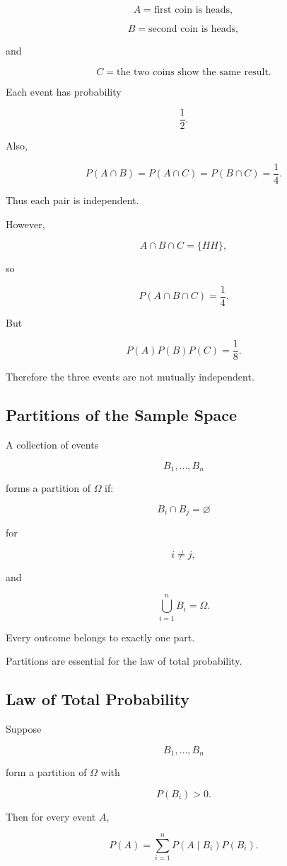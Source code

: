 \[
A
=
\text{first coin is heads},
\]

\[
B
=
\text{second coin is heads},
\]

and

\[
C
=
\text{the two coins show the same result}.
\]

Each event has probability

\[
\frac12.
\]

Also,

\[
P(A\cap B)
=
P(A\cap C)
=
P(B\cap C)
=
\frac14.
\]

Thus each pair is independent.

However,

\[
A\cap B\cap C
=
\{HH\},
\]

so

\[
P(A\cap B\cap C)=\frac14.
\]

But

\[
P(A)P(B)P(C)
=
\frac18.
\]

Therefore the three events are not mutually independent.

\subsection{Partitions of the Sample Space}
\label{subsec:sample-space-partitions}

A collection of events

\[
B_1,\ldots,B_n
\]

forms a partition of \(\Omega\) if:

\[
B_i\cap B_j=\varnothing
\]

for

\[
i\neq j,
\]

and

\[
\boxed{
\bigcup_{i=1}^{n}B_i=\Omega.
}
\]

Every outcome belongs to exactly one part.

Partitions are essential for the law of total probability.

\subsection{Law of Total Probability}
\label{subsec:law-total-probability}

\begin{theorem}
Suppose

\[
B_1,\ldots,B_n
\]

form a partition of \(\Omega\) with

\[
P(B_i)>0.
\]

Then for every event \(A\),

\[
\boxed{
P(A)
=
\sum_{i=1}^{n}
P(A\mid B_i)P(B_i).
}
\]
\end{theorem}

